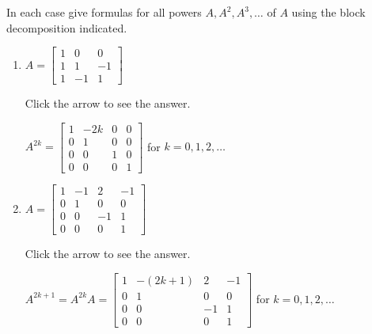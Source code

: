 \documentclass{ximera}
\begin{document}
\begin{problem}\label{prob:block_powers}
In each case give formulas for all powers $A, A^{2}, A^{3}, \dots$ of $A$ using the block decomposition indicated.


\begin{enumerate}
\item
$A = \left[ \begin{array}{r|rr}
1 & 0 & 0 \\
\hline
1 & 1  & -1\\
1 & -1 & 1
\end{array} \right]
$

Click the arrow to see the answer.
\begin{expandable}
$
A^{2k} = \left[ \begin{array}{rc|rr}
1 & -2k & 0 & 0 \\
0 & 1 & 0 & 0 \\
\hline
0 & 0 & 1 & 0 \\
0 & 0 & 0 & 1
\end{array} \right]$ for $k = 0, 1, 2, \dots$
\end{expandable}

\item
$A = \left[ \begin{array}{rr|rr}
1 & -1 & 2 & -1 \\
0 & 1 & 0 & 0 \\
\hline
0 & 0 & -1 & 1 \\
0 & 0 & 0 & 1
\end{array} \right]
$

Click the arrow to see the answer.
\begin{expandable}
$A^{2k + 1} = A^{2k}A = \left[ \begin{array}{rc|rr}
1 & -(2k + 1) & 2 & -1 \\
0 & 1 & 0 & 0 \\
\hline
0 & 0 & -1 & 1 \\
0 & 0 & 0 & 1
\end{array} \right]$ for $k = 0, 1, 2, \dots$
\end{expandable}
\end{enumerate}
\end{problem}
\end{document}
